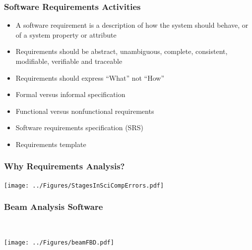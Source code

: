 \documentclass[t,12pt,numbers,fleqn]{beamer}
\begin{document}
\begin{frame}
\frametitle{Software Requirements Activities}
\begin{itemize}
\item A software requirement is a description of how the system should behave,
  or of a system property or attribute
\item Requirements should be abstract, unambiguous, complete, consistent,
  modifiable, verifiable and traceable
\item Requirements should express ``What'' not ``How''
\item Formal versus informal specification
\item Functional versus nonfunctional requirements
\item Software requirements specification (SRS)
\item Requirements template
\end{itemize}
\end{frame}


\begin{frame}
\frametitle{Why Requirements Analysis?}
\begin{center}
 \texttt{[image: ../Figures/StagesInSciCompErrors.pdf]}
\end{center}
\end{frame}


\begin{frame}
\frametitle{Beam Analysis Software}
~\newline
~\newline
\begin{center}
 \texttt{[image: ../Figures/beamFBD.pdf]}
\end{center}
\end{frame}

\end{document}
